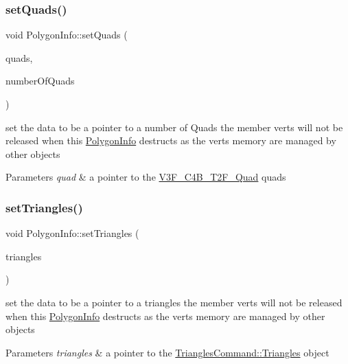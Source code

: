 \subsubsection{\texorpdfstring{set\+Quads()}{setQuads()}}
{\footnotesize\ttfamily void Polygon\+Info\+::set\+Quads (\begin{DoxyParamCaption}\item[{\hyperlink{structV3F__C4B__T2F__Quad}{V3\+F\+\_\+\+C4\+B\+\_\+\+T2\+F\+\_\+\+Quad} $\ast$}]{quads,  }\item[{int}]{number\+Of\+Quads }\end{DoxyParamCaption})}

set the data to be a pointer to a number of Quads the member verts will not be released when this \hyperlink{classPolygonInfo}{Polygon\+Info} destructs as the verts memory are managed by other objects 
\begin{DoxyParams}{Parameters}
{\em quad} & a pointer to the \hyperlink{structV3F__C4B__T2F__Quad}{V3\+F\+\_\+\+C4\+B\+\_\+\+T2\+F\+\_\+\+Quad} quads \\
\hline
\end{DoxyParams}
\mbox{\label{group____2d_ga0fd028d854bdb30347161b5d816743a4}} 
\subsubsection{\texorpdfstring{set\+Triangles()}{setTriangles()}}
{\footnotesize\ttfamily void Polygon\+Info\+::set\+Triangles (\begin{DoxyParamCaption}\item[{const \hyperlink{structTrianglesCommand_1_1Triangles}{Triangles\+Command\+::\+Triangles} \&}]{triangles }\end{DoxyParamCaption})}

set the data to be a pointer to a triangles the member verts will not be released when this \hyperlink{classPolygonInfo}{Polygon\+Info} destructs as the verts memory are managed by other objects 
\begin{DoxyParams}{Parameters}
{\em triangles} & a pointer to the \hyperlink{structTrianglesCommand_1_1Triangles}{Triangles\+Command\+::\+Triangles} object \\
\hline
\end{DoxyParams}
\mbox{\label{group____2d_gad9ffba6df684ed89dbed2173e66f2969}} 
